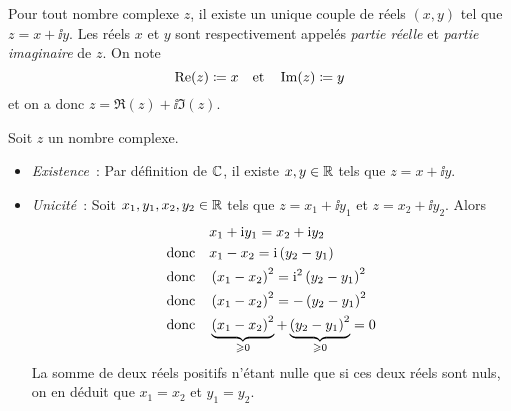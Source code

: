 \documentclass{magnolia}
\begin{document}
\begin{definition}[utile=-3]
  Pour tout nombre complexe $z$, il existe un unique couple de réels $(x,y)$ 
  tel que $z=x+\ii y$. Les réels $x$ et $y$ sont respectivement appelés \emph{partie réelle} et \emph{partie imaginaire} de $z$. On note
  $$\mathop{\rm Re}(z)\coloneqq x \quad \text{et} \quad \mathop{\rm Im}(z)\coloneqq y$$
et on a donc $z=\Re(z)+\ii\Im(z)$.
\end{definition}
\begin{preuve}
  Soit $z$ un nombre complexe.
  \begin{itemize}
  \item \emph{Existence}~:
    Par définition de $\mathbb{C}$, il existe $x,y\in\mathbb{R}$ tels que $z=x+\ii y$.
  \item \emph{Unicité}~:
    Soit $x_1,y_1,x_2,y_2\in\mathbb{R}$ tels que $z=x_1+\ii y_1$ et $z=x_2+\ii y_2$. Alors
    \begin{equation*}\begin{split}
    & x_1+{\rm i} y_1=x_2+{\rm i} y_2\\
    \text{donc}\quad  & x_1-x_2={\rm i}\left(y_2-y_1\right)\\
    \text{donc}\quad  & \left(x_1-x_2\right)^2={\rm i}^2\left(y_2-y_1\right)^2\\   
    \text{donc}\quad  & \left(x_1-x_2\right)^2=-\left(y_2-y_1\right)^2\\   
    \text{donc}\quad  & \underbrace{\left(x_1-x_2\right)^2}_{\geqslant 0}+
                        \underbrace{\left(y_2-y_1\right)^2}_{\geqslant 0}=0
    \end{split}\end{equation*}
    La somme de deux réels positifs n'étant nulle que si ces deux réels sont
    nuls, on en déduit que $x_1=x_2$ et $y_1=y_2$.
  \end{itemize}
\end{preuve}
\end{document}
